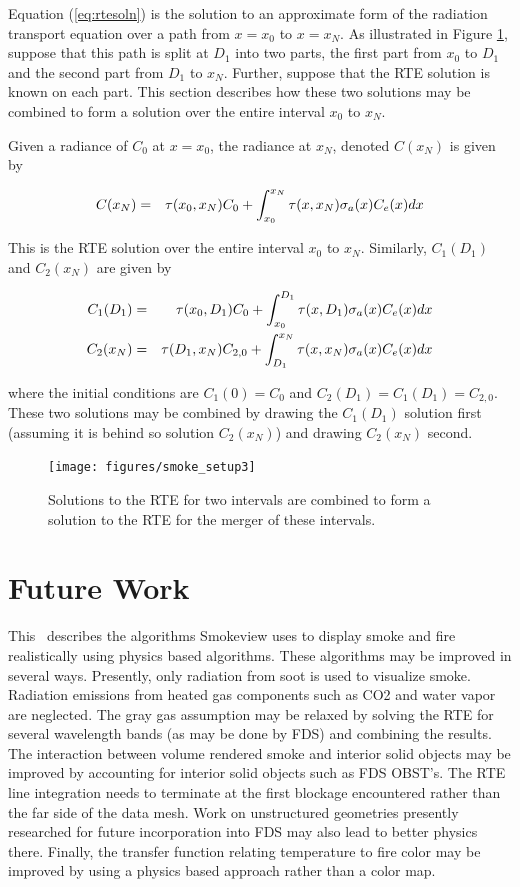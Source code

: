 Equation (\ref{eq:rtesoln}) is the solution to an approximate form of the radiation transport equation over a path from $x=x_0$ to $x=x_N$.  As illustrated in Figure \ref{figsmokesetup3}, suppose that this path is split at $D_1$ into two parts, the first part from $x_0$ to $D_1$ and the second part from $D_1$ to $x_N$. Further, suppose that the RTE solution is known on each part. This section describes how these two solutions may be combined to form a solution over the entire interval $x_0$ to $x_N$.

Given a radiance of $C_0$ at $x=x_0$, the radiance at $x_N$, denoted $C(x_N)$ is given by

\begin{eqnarray}
\label{eq:rtesoln2}
C(x_N)&=&\tau(x_0,x_N)C_0 + \int_{x_0}^{x_N}\tau(x,x_N)\sigma_a(x)C_e(x) dx
\end{eqnarray}

This is the RTE solution over the entire interval $x_0$ to $x_N$. Similarly, $C_1(D_1)$ and $C_2(x_N)$ are given by

\begin{eqnarray*}
C_1(D_1)&=&\tau(x_0,D_1)C_0 + \int_{x_0}^{D_1}\tau(x,D_1)\sigma_a(x)C_e(x) dx\\
C_2(x_N)&=&\tau(D_1,x_N)C_{2,0} + \int_{D_1}^{x_N}\tau(x,x_N)\sigma_a(x)C_e(x) dx
\end{eqnarray*}

where the initial conditions are $C_1(0)=C_0$ and $C_2(D_1)=C_1(D_1)=C_{2,0}$.  These two solutions may be combined by drawing the $C_1(D_1)$ solution first (assuming it is behind so solution $C_2(x_N)$) and drawing $C_2(x_N)$ second.


\begin{figure}[\figoptions]
\begin{center}
\texttt{[image: figures/smoke\_setup3]}
\end{center}
\caption {Solutions to the RTE for two intervals are combined to form a solution to the RTE
for the merger of these intervals.
}
\label{figsmokesetup3}
\end{figure}

\section{Future Work}
This \paper\ describes the algorithms Smokeview uses to display smoke and fire realistically using physics based algorithms.  These algorithms may be improved in several ways.  Presently, only radiation from soot is used to visualize smoke.  Radiation emissions from heated gas components such as CO2 and water vapor are neglected.  The gray gas assumption may be relaxed by solving the RTE for several wavelength bands (as may be done by FDS) and combining the results.  The interaction between volume rendered smoke and interior solid objects may be improved by accounting for interior solid objects such as FDS OBST's.  The RTE line integration needs to terminate at the first blockage encountered rather than the far side of the data mesh.  Work on unstructured geometries presently researched for future incorporation into FDS may also lead to better physics there.  Finally, the transfer function relating temperature to fire color may be improved by using a physics based approach rather than a color map.


